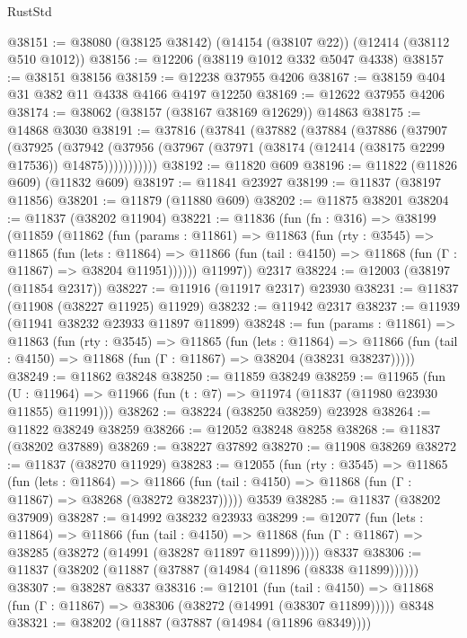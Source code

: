 \begin{lexlean}{RustStd}
\begin{coremodule}
{\begin{coremodule}
{{{{{{{{{{{{{{{{{{{{{{{{{{{{{{{{{{{{{{{{{{{{{{{{{{@38151 := @38080 (@38125 @38142) (@14154 (@38107 @22)) (@12414 (@38112 @510 @1012))
@38156 := @12206 (@38119 @1012 @332 @5047 @4338)
@38157 := @38151 @38156
@38159 := @12238 @37955 @4206
@38167 := @38159 @404 @31 @382 @11 @4338 @4166 @4197 @12250
@38169 := @12622 @37955 @4206
@38174 := @38062 (@38157 (@38167 @38169 @12629)) @14863
@38175 := @14868 @3030
@38191 := @37816
    (@37841
      (@37882
        (@37884
          (@37886
            (@37907
              (@37925
                (@37942
                  (@37956 (@37967 (@37971 (@38174 (@12414 (@38175 @2299 @17536)) @14875)))))))))))
@38192 := @11820 @609
@38196 := @11822 (@11826 @609) (@11832 @609)
@38197 := @11841 @23927
@38199 := @11837 (@38197 @11856)
@38201 := @11879 (@11880 @609)
@38202 := @11875 @38201
@38204 := @11837 (@38202 @11904)
@38221 := @11836
    (fun (fn : @316) =>
    @38199
      (@11859
        (@11862
          (fun (params : @11861) =>
          @11863
            (fun (rty : @3545) =>
            @11865
              (fun (lets : @11864) =>
              @11866 (fun (tail : @4150) => @11868 (fun (Γ : @11867) => @38204 @11951))))))
        @11997))
    @2317
@38224 := @12003 (@38197 (@11854 @2317))
@38227 := @11916 (@11917 @2317) @23930
@38231 := @11837 (@11908 (@38227 @11925) @11929)
@38232 := @11942 @2317
@38237 := @11939 (@11941 @38232 @23933 @11897 @11899)
@38248 := fun (params : @11861) =>
  @11863
    (fun (rty : @3545) =>
    @11865
      (fun (lets : @11864) =>
      @11866 (fun (tail : @4150) => @11868 (fun (Γ : @11867) => @38204 (@38231 @38237)))))
@38249 := @11862 @38248
@38250 := @11859 @38249
@38259 := @11965
    (fun (U : @11964) => @11966 (fun (t : @7) => @11974 (@11837 (@11980 @23930 @11855) @11991)))
@38262 := @38224 (@38250 @38259) @23928
@38264 := @11822 @38249 @38259
@38266 := @12052 @38248 @8258
@38268 := @11837 (@38202 @37889)
@38269 := @38227 @37892
@38270 := @11908 @38269
@38272 := @11837 (@38270 @11929)
@38283 := @12055
    (fun (rty : @3545) =>
    @11865
      (fun (lets : @11864) =>
      @11866 (fun (tail : @4150) => @11868 (fun (Γ : @11867) => @38268 (@38272 @38237)))))
    @3539
@38285 := @11837 (@38202 @37909)
@38287 := @14992 @38232 @23933
@38299 := @12077
    (fun (lets : @11864) =>
    @11866
      (fun (tail : @4150) =>
      @11868 (fun (Γ : @11867) => @38285 (@38272 (@14991 (@38287 @11897 @11899))))))
    @8337
@38306 := @11837 (@38202 (@11887 (@37887 (@14984 (@11896 (@8338 @11899))))))
@38307 := @38287 @8337
@38316 := @12101
    (fun (tail : @4150) => @11868 (fun (Γ : @11867) => @38306 (@38272 (@14991 (@38307 @11899)))))
    @8348
@38321 := @38202 (@11887 (@37887 (@14984 (@11896 @8349))))
}}}}}}}}}}}}}}}}}}}}}}}}}}}}}}}}}}}}}}}}}}}}}}}}}}
\end{coremodule}}
\end{coremodule}
\end{lexlean}
